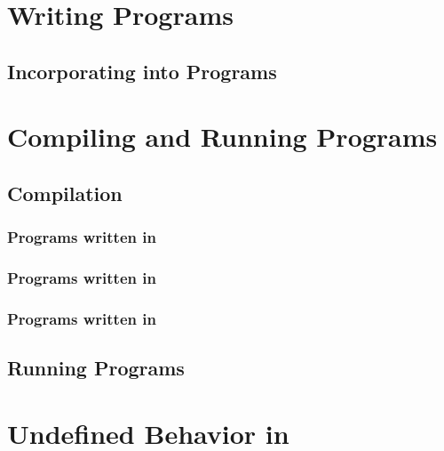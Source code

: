 \clearpage

\appendix

\pagestyle{fancy} \withlinenumbers
\fancyhf{}
\fancyhead[RE, LO]{\leftmark}
\fancyhead[RO, LE]{\thepage}
\fancyfoot[CE,CO]{\thepage}
\renewcommand{\headrulewidth}{0pt}




\chapter{Writing \qcor Programs}
\section*{Incorporating \qcor{} into Programs}\label{sec:writing_programs}



\chapter{Compiling and Running Programs}\label{sec:compiling}

\section{Compilation}
\subsection*{Programs written in \Clang}


\subsection*{Programs written in \Cpp}

\subsection*{Programs written in \Python}


\section{Running Programs}





\chapter{Undefined Behavior in \qcor}\label{sec:undefined}





